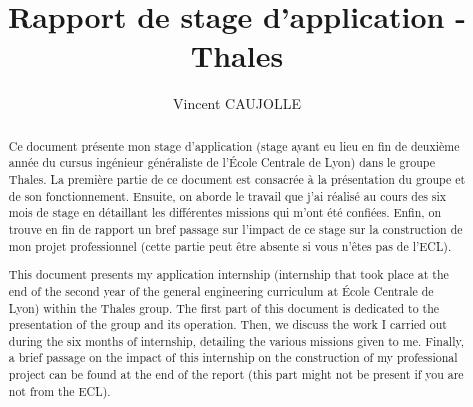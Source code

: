 \documentclass[a4paper, 12pt]{article}
\title{Rapport de stage d'application - Thales}
\date{}
\author{Vincent CAUJOLLE}
\begin{document}
\maketitle
\newpage
{}
\renewcommand{\abstractname}{Résumé}
\begin{abstract}
Ce document présente mon stage d'application (stage ayant eu lieu en fin de deuxième année du cursus ingénieur généraliste de l'École Centrale de Lyon) dans le groupe Thales. La première partie de ce document est consacrée à la présentation du groupe et de son fonctionnement. Ensuite, on aborde le travail que j'ai réalisé au cours des six mois de stage en détaillant les différentes missions qui m'ont été confiées. Enfin, on trouve en fin de rapport un bref passage sur l'impact de ce stage sur la construction de mon projet professionnel (cette partie peut être absente si vous n'êtes pas de l'ECL).
\end{abstract}
\vspace{1cm}
\renewcommand{\abstractname}{Abstract}
\begin{abstract}
This document presents my application internship (internship that took place at the end of the second year of the general engineering curriculum at École Centrale de Lyon) within the Thales group. The first part of this document is dedicated to the presentation of the group and its operation. Then, we discuss the work I carried out during the six months of internship, detailing the various missions given to me. Finally, a brief passage on the impact of this internship on the construction of my professional project can be found at the end of the report (this part might not be present if you are not from the ECL).
\end{abstract}
\newpage
\tableofcontents
\newpage
\listoffigures
\listoftables
\newpage
\end{document}
